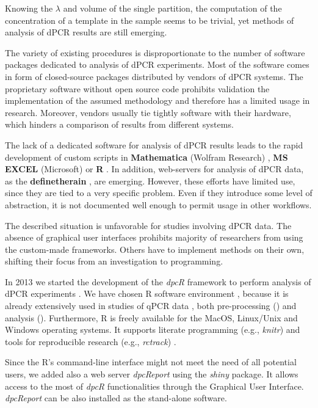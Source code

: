 \documentclass[a4,center,fleqn]{NAR}
\begin{document}
Knowing the $\lambda$ and volume of the single partition, the computation of 
the concentration of a template in the sample seems to be trivial, yet methods 
of analysis of dPCR results are still emerging.

The variety of existing procedures is disproportionate to the number of 
software packages dedicated to analysis of dPCR experiments. Most of the 
software comes in form of closed-source packages distributed by vendors of dPCR 
systems. The proprietary software without open source code prohibits validation 
the implementation of the assumed methodology and therefore has a limited usage 
in research. Moreover, vendors usually tie tightly software with their 
hardware, which hinders a comparison of results from different systems.

The lack of a dedicated software for analysis of dPCR results leads to the rapid 
development of custom scripts in \textbf{Mathematica} (Wolfram Research) 
\cite{strain_highly_2013}, \textbf{MS EXCEL} (Microsoft) 
\cite{dobnik_multiplex_2015} or \textbf{R} \cite{trypsteen_ddpcrquant_2015, 
dreo_optimising_2014}. In addition, web-servers for analysis of dPCR data, as 
the \textbf{definetherain} \cite{jones_low_2014}, are emerging. However, these 
efforts have limited use, since they are tied to a very specific problem. Even 
if they introduce some level of abstraction, it is not documented well enough to 
permit usage in other workflows.

The described situation is unfavorable for studies involving dPCR data. The 
absence of graphical user interfaces prohibits majority of researchers from 
using the custom-made frameworks. Others have to implement methods on their own, 
shifting their focus from an investigation to programming. 

In 2013 we started the development of the \textit{dpcR} framework to perform 
analysis of dPCR experiments \cite{burdukiewicz_dpcr:_2013}. We have chosen R 
software environment \cite{Rcitation}, because it is already extensively used 
in studies of qPCR data \cite{pabinger_survey_2014, rodiger_r_2015}, both 
pre-processing (\cite{roediger2015chippcr, perkins_readqpcr_2012}) and 
analysis (\cite{rodiger_surface_2013, ritz_qpcr_2008}). Furthermore, R is 
freely available for the MacOS, Linux/Unix and Windows operating systems. It 
supports literate programming (e.g., \textit{knitr}) and tools for reproducible 
research (e.g., \textit{rctrack}) \cite{liu_r_2014}. 

Since the R's command-line interface might not meet the need of all potential 
users, we added also a web server \textit{dpcReport} using the \textit{shiny} 
package. It allows access to the most of \textit{dpcR} functionalities through 
the Graphical User Interface. \textit{dpcReport} can be also installed as the 
stand-alone software.
\end{document}
